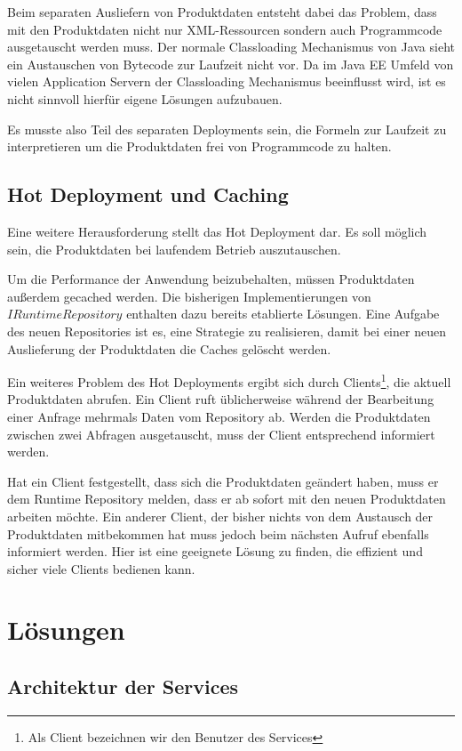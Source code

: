 \documentclass[headsepline=true, footsepline=true]{scrartcl}
\begin{document}
Beim separaten Ausliefern von Produktdaten entsteht dabei das Problem, dass mit
den Produktdaten nicht nur XML-Ressourcen sondern auch Programmcode ausgetauscht
werden muss. Der normale Classloading Mechanismus von Java sieht ein Austauschen
von Bytecode zur Laufzeit nicht vor. Da im Java EE Umfeld von vielen Application
Servern der Classloading Mechanismus beeinflusst wird, ist es nicht sinnvoll
hierfür eigene Lösungen aufzubauen.

Es musste also Teil des separaten Deployments sein, die Formeln
zur Laufzeit zu interpretieren um die Produktdaten frei von Programmcode zu
halten.

\subsection{Hot Deployment und Caching}
\label{hot_deployment}

Eine weitere Herausforderung stellt das Hot Deployment dar. Es soll möglich
sein, die Produktdaten bei laufendem Betrieb auszutauschen.

Um die Performance der Anwendung beizubehalten, müssen Produktdaten außerdem
gecached werden. Die bisherigen Implementierungen von $IRuntimeRepository$
enthalten dazu bereits etablierte Lösungen. Eine Aufgabe des neuen Repositories
ist es, eine Strategie zu realisieren, damit bei einer neuen Auslieferung der
Produktdaten die Caches gelöscht werden.

Ein weiteres Problem des Hot Deployments ergibt sich durch
Clients\footnote{Als Client bezeichnen wir den Benutzer des Services}, die aktuell Produktdaten abrufen. Ein Client ruft
üblicherweise während der Bearbeitung einer Anfrage mehrmals Daten vom
Repository ab. Werden die Produktdaten zwischen zwei Abfragen ausgetauscht, 
muss der Client entsprechend informiert werden.

Hat ein Client festgestellt, dass sich die Produktdaten geändert haben, muss er
dem Runtime Repository melden, dass er ab sofort mit den neuen Produktdaten
arbeiten möchte. Ein anderer Client, der bisher nichts von dem Austausch der
Produktdaten mitbekommen hat muss jedoch beim nächsten Aufruf ebenfalls
informiert werden. Hier ist eine geeignete Lösung zu finden, die effizient
und sicher viele Clients bedienen kann.

\section{Lösungen}

\subsection{Architektur der Services}
\end{document}
